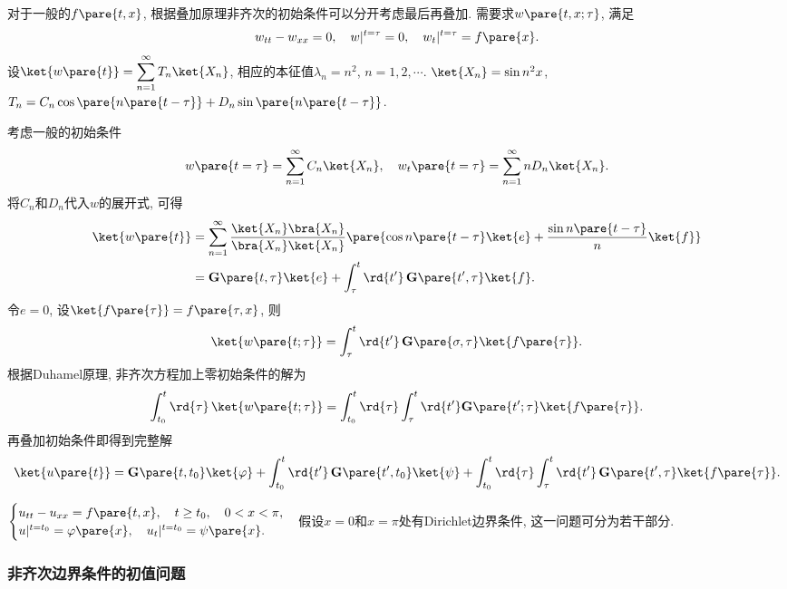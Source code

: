 \documentclass[hidelinks]{ctexart}
\begin{document}
对于一般的$f\pare{t,x}$, 根据叠加原理非齐次的初始条件可以分开考虑最后再叠加. 需要求$w\pare{t,x;\tau}$, 满足
\[ w_{tt} - w_{xx} = 0,\quad w\vert^{t=\tau} = 0,\quad w_t\vert^{t=\tau} = f\pare{x}. \]
设$\displaystyle \ket{w\pare{t}} = \sum_{n=1}^\infty T_n\ket{X_n}$, 相应的本征值$\lambda_n = n^2$, $n = 1,2,\cdots$. $\ket{X_n} = \sin n^2 x$, $T_n = C_n \cos \pare{n\pare{t-\tau}} + D_n \sin\pare{n\pare{t-\tau}}$.
\par
考虑一般的初始条件
\[ w\pare{t=\tau} = \displaystyle \sum_{n=1}^\infty C_n\ket{X_n},\quad w_t\pare{t=\tau} = \displaystyle \sum_{n=1}^\infty nD_n\ket{X_n}. \]
将$C_n$和$D_n$代入$w$的展开式, 可得
\begin{align*}
    \ket{w\pare{t}} &= \sum_{n=1}^\infty \frac{\ket{X_n}\bra{X_n}}{\bra{X_n}\ket{X_n}}\pare{\cos n\pare{t-\tau}\ket{e} + \frac{\sin n\pare{t-\tau}}{n}\ket{f}} \\
    &= \mathbf{G}\pare{t,\tau} \ket{e} + \int_\tau^t \rd{t'}\, \mathbf{G}\pare{t',\tau}\ket{f}.
\end{align*}
令$e=0$, 设$\ket{f\pare{\tau}} = f\pare{\tau,x}$, 则
\[ \ket{w\pare{t;\tau}} = \int_\tau^t \rd{t'}\,\mathbf{G}\pare{\sigma,\tau}\ket{f\pare{\tau}}. \]
根据Duhamel原理, 非齐次方程加上零初始条件的解为
\[ \int_{t_0}^t \rd{\tau}\,\ket{w\pare{t;\tau}} = \int_{t_0}^t\rd{\tau} \int_\tau^t \rd{t'} \mathbf{G}\pare{t';\tau}\ket{f\pare{\tau}}. \]
再叠加初始条件即得到完整解
\[ \ket{u\pare{t}} = \mathbf{G}\pare{t,t_0}\ket{\varphi} + \int_{t_0}^t \rd{t'}\, \mathbf{G}\pare{t',t_0}\ket{\psi} + \int_{t_0}^t \rd{\tau}\int_\tau^t \rd{t'}\, \mathbf{G}\pare{t',\tau} \ket{f\pare{\tau}}. \]


\begin{sample}
    \begin{ex}
        $\begin{cases}
            u_{tt} - u_{xx} = f\pare{t,x},\quad t\ge t_0,\quad 0<x<\pi,\\
            u\vert^{t=t_0} = \varphi\pare{x},\quad u_t\vert^{t=t_0}=\psi\pare{x}.
        \end{cases}$假设$x=0$和$x=\pi$处有Dirichlet边界条件, 这一问题可分为若干部分.
    \end{ex}
\end{sample}

\subsubsection{非齐次边界条件的初值问题} %
\label{ssub:非齐次边界条件的初值问题}
\end{document}
